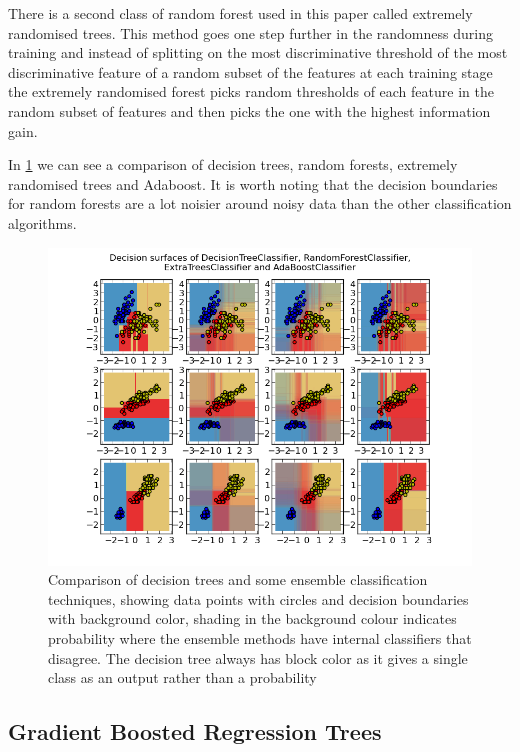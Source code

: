 \documentclass[ %
                    author={Sam Phippen},
                supervisor={Dr. Rafal Bogacz},
                     title={Real time voice activity detectors in noisy personal computing environments},
                  subtitle={},
                    degree={MEng},
                      year={2012} ]{thesis}
\begin{document}
There is a second class of random forest used in this paper called extremely
randomised trees. This method goes one step further in the randomness during
training and instead of splitting on the most discriminative threshold of the
most discriminative feature of a random subset of the features at each training
stage the extremely randomised forest picks random thresholds of each feature
in the random subset of features and then picks the one with the highest information
gain.

In \ref{fig:comparison} we can see a comparison of decision trees, random forests,
extremely randomised trees and Adaboost. It is worth noting that the decision
boundaries for random forests are a lot noisier around noisy data than the
other classification algorithms.

\begin{figure} \label{fig:comparison}
    \includegraphics[width=13cm]{classifier_comparison.png} \caption{Comparison
        of decision trees and some ensemble classification techniques, showing
        data points with circles and decision boundaries with background color,
        shading in the background colour indicates probability where the
        ensemble methods have internal classifiers that disagree. The decision
        tree always has block color as it gives a single class as an output
rather than a probability} \end{figure}

\subsection{Gradient Boosted Regression Trees}
\end{document}
